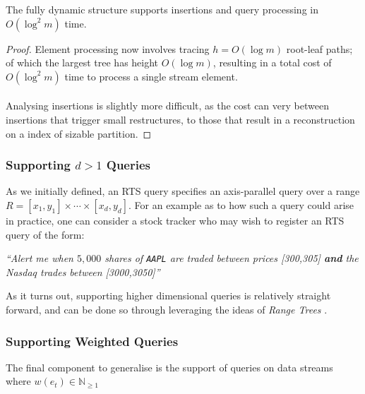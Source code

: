 \begin{lemma}
    The fully dynamic structure supports insertions and query processing in $O(\log^2 m)$ time.
\end{lemma}
\begin{proof}
    Element processing now involves tracing $h = O(\log m)$ root-leaf paths; of which the largest tree has height $O(\log m)$, resulting in a total cost of $O(\log^2 m)$ time to process a single stream element. \\
    \\
    Analysing insertions is slightly more difficult, as the cost can very between insertions that trigger small restructures, to those that result in a reconstruction on a index of sizable partition.
\end{proof}

\subsubsection*{Supporting $d>1$ Queries} 

As we initially defined, an RTS query specifies an axis-parallel query over a range $R = [x_1, y_1] \times \cdots \times [x_d, y_d]$. For an example as to how such a query could arise in practice, one can consider a stock tracker who may wish to register an RTS query of the form: 

\begin{center}
    \textit{``Alert me when $5,000$ shares of \texttt{AAPL} are traded between prices [300,305] \textbf{and} the Nasdaq trades between [3000,3050]''}
\end{center}
As it turns out, supporting higher dimensional queries is relatively straight forward, and can be done so through leveraging the ideas of \textit{Range Trees} \cite{RTrees, DeBerg}.


\subsubsection*{Supporting Weighted Queries}
The final component to generalise is the support of queries on data streams where $w(e_t) \in \mathbb{N}_{\geq1}$


